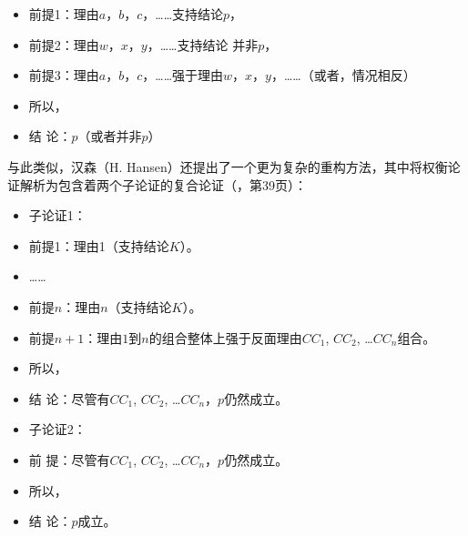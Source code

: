 \documentclass[b5paper,10.5pt,onecolumn,twoside,UTF8]{article}
\begin{document}
\begin{itemize}
\item[]前提1：理由$a$，$b$，$c$，……支持结论$p$，

\item[]前提2：理由$w$，$x$，$y$，……支持结论 并非$p$，

\item[]前提3：理由$a$，$b$，$c$，……强于理由$w$，$x$，$y$，……（或者，情况相反）

\item[]所以，

\item[]结  论：$p$（或者并非$p$） 
\end{itemize}

与此类似，汉森（H. Hansen）还提出了一个更为复杂的重构方法，其中将权衡论证解析为包含着两个子论证的复合论证（\parencite{a8}，第39页）：

\begin{itemize}

\item[]子论证1：

\item[]前提1：理由1（支持结论$K$）。

\item[]…… 

\item[]前提$n$：理由$n$（支持结论$K$）。

\item[]前提$n+1$：理由$1$到$n$的组合整体上强于反面理由$CC_1$, $CC_2$, …$CC_n$组合。

\item[]所以，

\item[]结 论：尽管有$CC_1$, $CC_2$, …$CC_n$，$p$仍然成立。

\end{itemize}

\begin{itemize}

\item[]子论证2：

\item[]前 提：尽管有$CC_1$, $CC_2$, …$CC_n$，$p$仍然成立。

\item[]所以，

\item[]结 论：$p$成立。

\end{itemize}
\end{document}
